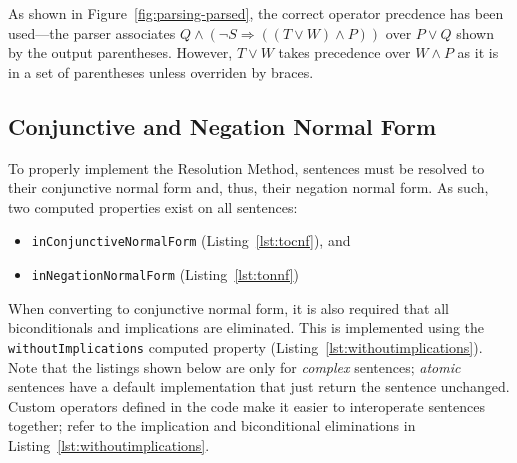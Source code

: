 As shown in Figure~\ref{fig:parsing-parsed}, the correct operator precdence has
been used---the parser associates $Q \wedge (\neg S \Rightarrow ((T \vee W) \wedge P))$
over $P \vee Q$ shown by the output parentheses. However, $T \vee W$ takes
precedence over $W \wedge P$ as it is in a set of parentheses unless overriden by braces.

\subsection{Conjunctive and Negation Normal Form}
\label{subs:CNF}

To properly implement the Resolution Method, sentences must be resolved to their
conjunctive normal form and, thus, their negation normal form. As such, two
computed properties exist on all sentences:

\begin{itemize}
  \item \texttt{inConjunctiveNormalForm} (Listing~\ref{lst:tocnf}), and
  \item \texttt{inNegationNormalForm} (Listing~\ref{lst:tonnf})
\end{itemize}

When converting to conjunctive normal form, it is also required that all biconditionals
and implications are eliminated. This is implemented using the \texttt{withoutImplications}
computed property (Listing~\ref{lst:withoutimplications}). Note that the listings shown below
are only for \emph{complex} sentences; \textit{atomic} sentences have a default
implementation that just return the sentence unchanged. Custom operators defined
in the code make it easier to interoperate sentences together; refer to the implication
and biconditional eliminations in Listing~\ref{lst:withoutimplications}.






